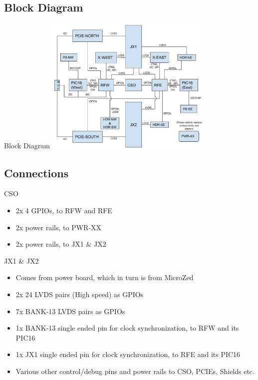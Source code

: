 \documentclass{beamer}
\begin{document}
\subsection{Block Diagram}

\begin{frame}{Block Diagram}
    \includegraphics[width=8cm]{images/main_board_block_diagram.jpg}
\end{frame}

\subsection{Connections}

\begin{frame}{CSO}
    \begin{itemize}
    \item 2x 4 GPIOs, to RFW and RFE 
    \item 2x power rails, to PWR-XX
    \item 2x power rails, to JX1 \& JX2
    \end{itemize}
\end{frame}

\begin{frame}{JX1 \& JX2}
    \begin{itemize}
    \item Comes from power board, which in turn is from MicroZed
    \item 2x 24 LVDS pairs (High speed) as GPIOs
    \item 7x BANK-13 LVDS pairs as GPIOs
    \item 1x BANK-13 single ended pin for clock synchronization, to RFW and its PIC16
    \item 1x JX1 single ended pin for clock synchronization, to RFE and its PIC16
    \item Various other control/debug pins and power rails to CSO, PCIEs, Shields etc.
    \end{itemize}
\end{frame}
\end{document}
